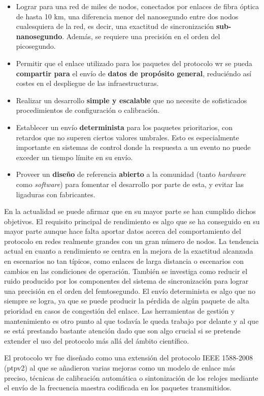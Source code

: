 \begin{itemize}
	\item Lograr para una red de miles de nodos, conectados por enlaces de 
	fibra óptica de hasta 10 km, una diferencia menor del nanosegundo entre dos 
	nodos cualesquiera de la red, es decir, una exactitud de sincronización 
	\textbf{sub-nanosegundo}. Además, se requiere una precisión en el orden del 
	picosegundo.
	
	\item Permitir que el enlace utilizado para los paquetes del protocolo 
	\gls{wr} se pueda \textbf{compartir para} el envío de \textbf{datos de 
	propósito general}, 
	reduciéndo así costes en el despliegue de las infraestructuras.
	
	\item Realizar un desarrollo \textbf{simple y escalable} que no necesite de 
	sofisticados procedimientos de configuración o calibración.
	
	\item Establecer un envío \textbf{determinista} para los paquetes 
	prioritarios, con 
	retardos que no superen ciertos valores umbrales. Esto es especialmente 
	importante en sistemas de control donde la respuesta a un evento no puede 
	exceder un tiempo límite en su envío.
	
	\item Proveer un \textbf{diseño} de referencia \textbf{abierto} a la 
	comunidad 
	(tanto \textit{hardware} como \textit{software}) para fomentar el 
	desarrollo por parte de esta, y evitar las ligaduras con fabricantes.
\end{itemize}

En la actualidad se puede afirmar que en su mayor parte se han cumplido dichos 
objetivos. El requisito principal de rendimiento es algo que se ha conseguido 
en su mayor parte aunque hace falta aportar datos acerca del comportamiento del 
protocolo en redes realmente grandes con un gran número de nodos. La tendencia 
actual en cuanto a rendimiento se centra en la mejora de la exactitud alcanzada 
en escenarios no tan típicos, como enlaces de larga distancia o escenarios con 
cambios en las condiciones de operación. También se investiga como reducir el 
ruido producido por los componentes del sistema de sincronización para lograr 
una precisión en el orden del femtosegundo. El envío determinista es algo que 
no siempre se logra, ya que se puede producir la pérdida de algún paquete de 
alta prioridad en casos de congestión del enlace. Las herramientas de gestión y 
mantenimiento es otro punto al que todavía le queda trabajo por delante y al 
que se está prestando bastante atención dado que son algo crucial si se 
pretende extender el uso del protocolo más allá del ámbito científico.

El protocolo \gls{wr} fue diseñado como una extensión del protocolo IEEE 
1588-2008 (\gls{ptp}v2) al que se añadieron varias mejoras como un modelo de 
enlace más preciso, técnicas de calibración automática o sintonización de los 
relojes mediante el envío de la frecuencia maestra codificada en los paquetes 
transmitidos.



